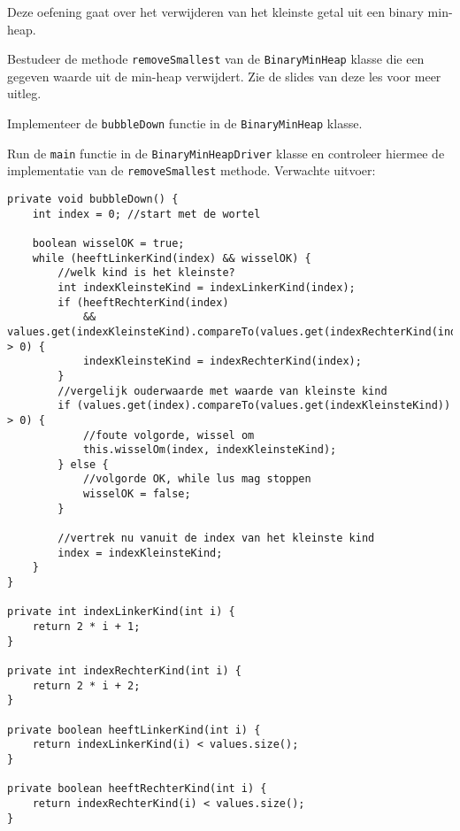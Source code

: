 \begin{oef}
\code Deze oefening gaat over het verwijderen van het kleinste getal uit een binary min-heap.
\begin{oefenumerate}
	\item Bestudeer de methode \verb=removeSmallest= van de \verb=BinaryMinHeap= klasse die een gegeven waarde uit de min-heap verwijdert. Zie de slides van deze les voor meer uitleg.
	\item Implementeer de \verb=bubbleDown= functie in de \verb=BinaryMinHeap= klasse.
	\item Run de \verb=main= functie in de \verb=BinaryMinHeapDriver= klasse en controleer hiermee de implementatie van de \verb=removeSmallest= methode. \newline Verwachte uitvoer:  \newline
[-4, 0, -2, 2, 1, 2, -1, 3]  \newline
[-2, 0, -1, 2, 1, 2, 3]  \newline
[-1, 0, 2, 2, 1, 3]  \newline
[0, 1, 2, 2, 3]  \newline
[1, 2, 2, 3]
\end{oefenumerate}
\begin{opl}
\begin{lstlisting}[caption={bubbleDown methode}, label=minheapbubbleDown]
private void bubbleDown() {
	int index = 0; //start met de wortel
		
	boolean wisselOK = true;
	while (heeftLinkerKind(index) && wisselOK) {
		//welk kind is het kleinste?
		int indexKleinsteKind = indexLinkerKind(index);
		if (heeftRechterKind(index)
			&& values.get(indexKleinsteKind).compareTo(values.get(indexRechterKind(index))) > 0) {
			indexKleinsteKind = indexRechterKind(index);
		}
		//vergelijk ouderwaarde met waarde van kleinste kind
		if (values.get(index).compareTo(values.get(indexKleinsteKind)) > 0) {
			//foute volgorde, wissel om				
			this.wisselOm(index, indexKleinsteKind);
		} else {
			//volgorde OK, while lus mag stoppen
			wisselOK = false;
		}
			
		//vertrek nu vanuit de index van het kleinste kind
		index = indexKleinsteKind;
	}
}

private int indexLinkerKind(int i) {
	return 2 * i + 1;
}
	
private int indexRechterKind(int i) {
	return 2 * i + 2;
}
	
private boolean heeftLinkerKind(int i) {
	return indexLinkerKind(i) < values.size();
}
	
private boolean heeftRechterKind(int i) {
	return indexRechterKind(i) < values.size();
}
\end{lstlisting}

\end{opl}

\end{oef}

